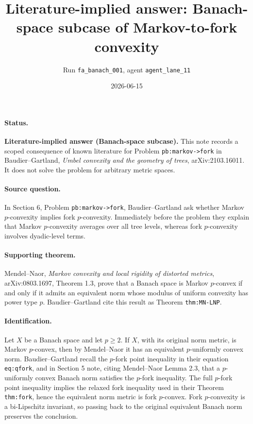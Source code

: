 \documentclass[11pt]{article}
\title{Literature-implied answer: Banach-space subcase of Markov-to-fork convexity}
\author{Run \texttt{fa\_banach\_001}, agent \texttt{agent\_lane\_11}}
\date{2026-06-15}
\begin{document}
\maketitle

\paragraph{Status.}
\textbf{Literature-implied answer (Banach-space subcase).}
This note records a scoped consequence of known literature for Problem
\texttt{pb:markov->fork} in Baudier--Gartland, \emph{Umbel convexity and the
geometry of trees}, arXiv:2103.16011. It does not solve the problem for
arbitrary metric spaces.

\paragraph{Source question.}
In Section 6, Problem \texttt{pb:markov->fork}, Baudier--Gartland ask whether
Markov \(p\)-convexity implies fork \(p\)-convexity. Immediately before the
problem they explain that Markov \(p\)-convexity averages over all tree levels,
whereas fork \(p\)-convexity involves dyadic-level terms.

\paragraph{Supporting theorem.}
Mendel--Naor, \emph{Markov convexity and local rigidity of distorted metrics},
arXiv:0803.1697, Theorem 1.3, prove that a Banach space is Markov
\(p\)-convex if and only if it admits an equivalent norm whose modulus of
uniform convexity has power type \(p\). Baudier--Gartland cite this result as
Theorem \texttt{thm:MN-LNP}.

\paragraph{Identification.}
Let \(X\) be a Banach space and let \(p\ge 2\). If \(X\), with its original
norm metric, is Markov \(p\)-convex, then by Mendel--Naor it has an equivalent
\(p\)-uniformly convex norm. Baudier--Gartland recall the \(p\)-fork point
inequality in their equation \texttt{eq:qfork}, and in Section 5 note, citing
Mendel--Naor Lemma 2.3, that a \(p\)-uniformly convex Banach norm satisfies the
\(p\)-fork inequality. The full \(p\)-fork point inequality implies the relaxed
fork inequality used in their Theorem \texttt{thm:fork}, hence the equivalent
norm metric is fork \(p\)-convex. Fork \(p\)-convexity is a bi-Lipschitz
invariant, so passing back to the original equivalent Banach norm preserves
the conclusion.
\end{document}
